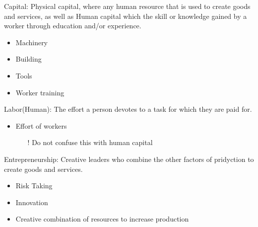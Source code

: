Capital: Physical capital, where any human resource that is used to create goods and services, as well as Human capital which the skill or knowledge gained by a worker through education and/or experience. 
\begin{itemize}
    \item Machinery 
    \item Building
    \item Tools
    \item Worker training
\end{itemize}

Labor(Human): The effort a person devotes to a task for which they are paid for.
\begin{itemize}
    \item Effort of workers
        \begin{itemize}
            \item[!] Do not confuse this with human capital
        \end{itemize}
\end{itemize}

Entrepreneurship: Creative leaders who combine the other factors of pridyction to create goods and services.
\begin{itemize}
    \item Risk Taking
    \item Innovation
    \item Creative combination of resources to increase production
\end{itemize}

